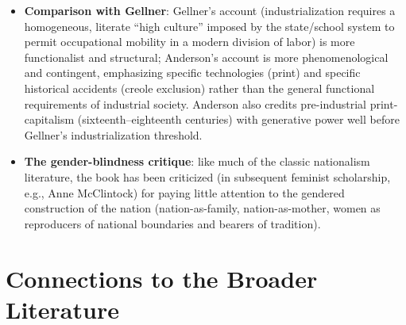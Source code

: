 \documentclass[12pt]{article}
\begin{document}
\begin{itemize}[leftmargin=*, itemsep=4pt]
    \item \textbf{Comparison with Gellner}: Gellner's account (industrialization requires a homogeneous, literate ``high culture'' imposed by the state/school system to permit occupational mobility in a modern division of labor) is more functionalist and structural; Anderson's account is more phenomenological and contingent, emphasizing specific technologies (print) and specific historical accidents (creole exclusion) rather than the general functional requirements of industrial society. Anderson also credits pre-industrial print-capitalism (sixteenth--eighteenth centuries) with generative power well before Gellner's industrialization threshold.
    \item \textbf{The gender-blindness critique}: like much of the classic nationalism literature, the book has been criticized (in subsequent feminist scholarship, e.g., Anne McClintock) for paying little attention to the gendered construction of the nation (nation-as-family, nation-as-mother, women as reproducers of national boundaries and bearers of tradition).
\end{itemize}

\section{Connections to the Broader Literature}
\end{document}
